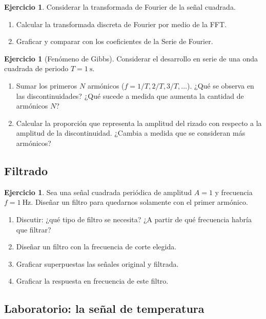 \documentclass[12pt, a4paper]{amsbook}
\theoremstyle{remark}
\theoremstyle{definition}
\newtheorem{ejer}[teo]{Ejercicio}
\numberwithin{section}{chapter}
\numberwithin{subsection}{section}
\numberwithin{equation}{section}
\numberwithin{figure}{chapter}
\begin{document}
\begin{ejer}
Considerar la transformada de Fourier de la señal cuadrada.
\begin{enumerate}
    \item Calcular la transformada discreta de Fourier por medio de la FFT.
    \item Graficar y comparar con los coeficientes de la Serie de Fourier.
\end{enumerate}

\end{ejer}

\begin{ejer}[Fenómeno de Gibbs]\label{gibbs}
Considerar el desarrollo en serie de una onda cuadrada de periodo $T=1~\text{s}$.
\begin{enumerate}
    \item Sumar los primeros $N$ armónicos ($f=1/T, 2/T, 3/T, \dots$). ¿Qué se observa en las discontinuidades? ¿Qué sucede a medida que aumenta la cantidad de armónicos $N$?
    \item Calcular la proporción que representa la amplitud del rizado con respecto a la amplitud de la discontinuidad. ¿Cambia a medida que se consideran más armónicos?
\end{enumerate}
\end{ejer}

\subsection*{Filtrado}

\begin{ejer}
Sea una señal cuadrada periódica de amplitud $A=1$ y frecuencia $f=1~\text{Hz}$. Diseñar un filtro para quedarnos solamente con el primer armónico.
\begin{enumerate}
\item Discutir: ¿qué tipo de filtro se necesita? ¿A partir de qué frecuencia habría que filtrar?
\item Diseñar un filtro con la frecuencia de corte elegida. 
\item Graficar superpuestas las señales original y filtrada.
\item Graficar la respuesta en frecuencia de este filtro.
\end{enumerate}
\end{ejer}


\subsection*{Laboratorio: la señal de temperatura}
\end{document}
